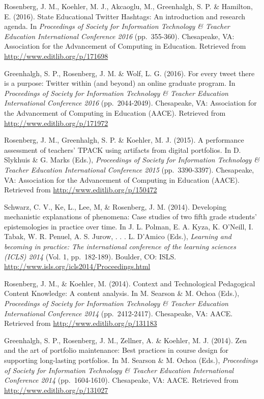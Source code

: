 \documentclass[14,]{article}
\begin{document}
Rosenberg, J. M., Koehler, M. J., Akcaoglu, M., Greenhalgh, S. P. \&
Hamilton, E. (2016). State Educational Twitter Hashtags: An introduction
and research agenda. In \emph{Proceedings of Society for Information
Technology \& Teacher Education International Conference 2016}
(pp.~355-360). Chesapeake, VA: Association for the Advancement of
Computing in Education. Retrieved from
\url{http://www.editlib.org/p/171698}

Greenhalgh, S. P., Rosenberg, J. M. \& Wolf, L. G. (2016). For every
tweet there is a purpose: Twitter within (and beyond) an online graduate
program. In \emph{Proceedings of Society for Information Technology \&
Teacher Education International Conference 2016} (pp.~2044-2049).
Chesapeake, VA: Association for the Advancement of Computing in
Education (AACE). Retrieved from \url{http://www.editlib.org/p/171972}

Rosenberg, J. M., Greenhalgh, S. P. \& Koehler, M. J. (2015). A
performance assessment of teachers' TPACK using artifacts from digital
portfolios. In D. Slykhuis \& G. Marks (Eds.), \emph{Proceedings of
Society for Information Technology \& Teacher Education International
Conference 2015} (pp.~3390-3397). Chesapeake, VA: Association for the
Advancement of Computing in Education (AACE). Retrieved from
\url{http://www.editlib.org/p/150472}

Schwarz, C. V., Ke, L., Lee, M, \& Rosenberg, J. M. (2014). Developing
mechanistic explanations of phenomena: Case studies of two fifth grade
students' epistemologies in practice over time. In J. L. Polman, E. A.
Kyza, K. O'Neill, I. Tabak, W. R. Penuel, A. S. Jurow, . . . L. D'Amico
(Eds.), \emph{Learning and becoming in practice: The international
conference of the learning sciences (ICLS) 2014} (Vol. 1, pp.~182-189).
Boulder, CO: ISLS. \url{http://www.isls.org/icls2014/Proceedings.html}

Rosenberg, J. M., \& Koehler, M. (2014). Context and Technological
Pedagogical Content Knowledge: A content analysis. In M. Searson \& M.
Ochoa (Eds.), \emph{Proceedings of Society for Information Technology \&
Teacher Education International Conference 2014} (pp.~2412-2417).
Chesapeake, VA: AACE. Retrieved from
\url{http://www.editlib.org/p/131183}

Greenhalgh, S. P., Rosenberg, J. M., Zellner, A. \& Koehler, M. J.
(2014). Zen and the art of portfolio maintenance: Best practices in
course design for supporting long-lasting portfolios. In M. Searson \&
M. Ochoa (Eds.), \emph{Proceedings of Society for Information Technology
\& Teacher Education International Conference 2014} (pp.~1604-1610).
Chesapeake, VA: AACE. Retrieved from
\url{http://www.editlib.org/p/131027}
\end{document}
